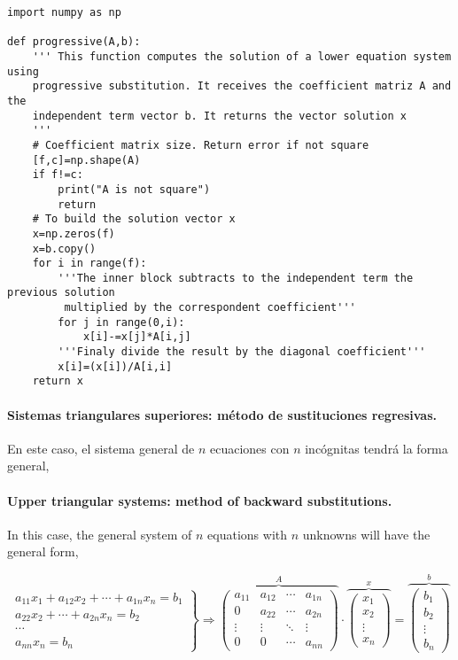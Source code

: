 \begin{verbatim}
import numpy as np

def progressive(A,b):
    ''' This function computes the solution of a lower equation system using 
    progressive substitution. It receives the coefficient matriz A and the 
    independent term vector b. It returns the vector solution x
    '''
    # Coefficient matrix size. Return error if not square
    [f,c]=np.shape(A)
    if f!=c:
        print("A is not square")
        return
    # To build the solution vector x
    x=np.zeros(f)
    x=b.copy()
    for i in range(f):
        '''The inner block subtracts to the independent term the previous solution
         multiplied by the correspondent coefficient'''
        for j in range(0,i):
            x[i]-=x[j]*A[i,j]
        '''Finaly divide the result by the diagonal coefficient'''
        x[i]=(x[i])/A[i,i]
    return x
\end{verbatim}

\begin{paracol}{2}


\paragraph{Sistemas triangulares superiores: método de sustituciones regresivas.} En este caso, el sistema general de $n$ ecuaciones con $n$ incógnitas tendrá la forma general,

\switchcolumn
\paragraph{Upper triangular systems: method of backward substitutions.} In this case, the general system of $n$ equations with $n$ unknowns will have the general form,
\end{paracol}

\begin{equation*}
\left. \begin{aligned}
a_{11}x_1+a_{12}x_2+\cdots +a_{1n}x_n=b_1\\
a_{22}x_2+\cdots +a_{2n}x_n=b_2\\
\cdots  \\
a_{nn}x_n=b_n
\end{aligned}\right\} \Rightarrow	\overbrace{\begin{pmatrix}
a_{11}& a_{12}& \cdots & a_{1n}\\
0& a_{22}& \cdots & a_{2n}\\
\vdots & \vdots & \ddots & \vdots\\
0& 0& \cdots & a_{nn}
\end{pmatrix}}^A \cdot \overbrace{\begin{pmatrix}
x_1\\
x_2\\
\vdots \\
x_n
\end{pmatrix}}^x=\overbrace{\begin{pmatrix}
b_1\\
b_2\\
\vdots \\
b_n
\end{pmatrix}}^b
\end{equation*}

